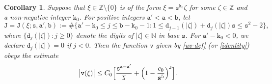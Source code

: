 \documentclass[12pt, twoside]{article}
\newtheorem{corollary}[theorem]{Corollary}
\theoremstyle{definition}
\numberwithin{equation}{section}
\begin{document}
\begin{corollary} \label{corollary-composite}
Suppose that $\xi \in \mathbb Z \setminus \{0\}$ is of the form $\xi = \mathtt s^{\mathtt k_0} \zeta$ for some $\zeta \in \mathbb Z$ and a non-negative integer $\mathtt k_0$. For positive integers $\mathtt a'< \mathtt a < \mathtt b$,  let  
\begin{equation} \label{Jab} 
\mathtt J = \mathtt J(\xi; \mathtt s, \mathtt a', \mathtt b) :=  \# \bigl\{ \mathtt a' -\mathtt k_0 \leq j \leq \mathtt b - \mathtt k_0-1 : 1 \leq \mathtt d_{j-1}(|\zeta|) + \mathtt d_j(|\zeta|) \mathtt s \leq \mathtt s^2-2 \bigr\}, 
\end{equation} 
where $\{\mathtt d_j(|\zeta|): j \geq 0\}$ denote the digits of $|\zeta| \in \mathbb N$ in base $\mathtt s$. For $\mathtt a' -\mathtt k_0 <0 $, we declare $\mathtt d_j(|\zeta|) = 0$ if $j < 0$. Then the function $\mathtt v$ given by \eqref{uv-def} (or \eqref{identity}) obeys the estimate 
\begin{equation} \label{corollary-composite-estimate}
\bigl| \mathtt v(\xi) \bigr| \leq C_0 \Bigl[ \frac{\mathtt s^{\mathtt a-\mathtt a'}}{\mathtt N} + \Bigl(1 - \frac{c_0}{\mathtt s^5}\Bigr)^{\mathtt J} \Bigr].  
\end{equation} 
\end{corollary} 
\end{document}
